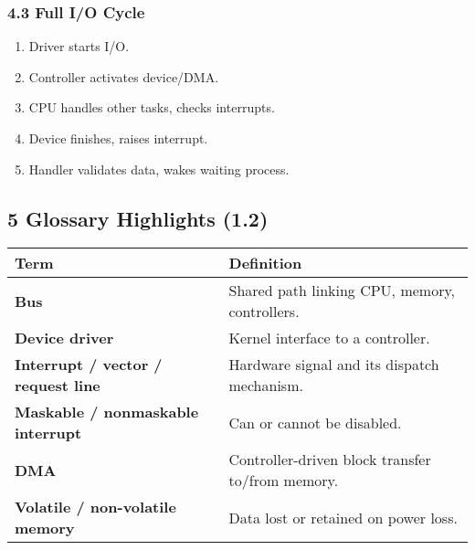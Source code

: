 \documentclass{article}
\begin{document}
\subsubsection*{4.3 Full I/O Cycle}
\begin{enumerate}[label=\arabic*.]
    \item Driver starts I/O.
    \item Controller activates device/DMA.
    \item CPU handles other tasks, checks interrupts.
    \item Device finishes, raises interrupt.
    \item Handler validates data, wakes waiting process.
\end{enumerate}

\subsection*{5 Glossary Highlights (1.2)}
\centering
\begin{tabular}{>{\RaggedRight}p{} >{\RaggedRight\arraybackslash}p{}}
\toprule
\textbf{Term} & \textbf{Definition} \\
\midrule
\textbf{Bus} & Shared path linking CPU, memory, controllers. \\
\textbf{Device driver} & Kernel interface to a controller. \\
\textbf{Interrupt / vector / request line} & Hardware signal and its dispatch mechanism. \\
\textbf{Maskable / nonmaskable interrupt} & Can or cannot be disabled. \\
\textbf{DMA} & Controller-driven block transfer to/from memory. \\
\textbf{Volatile / non-volatile memory} & Data lost or retained on power loss. \\
\bottomrule
\end{tabular}
\vspace{\baselineskip}
\end{document}
